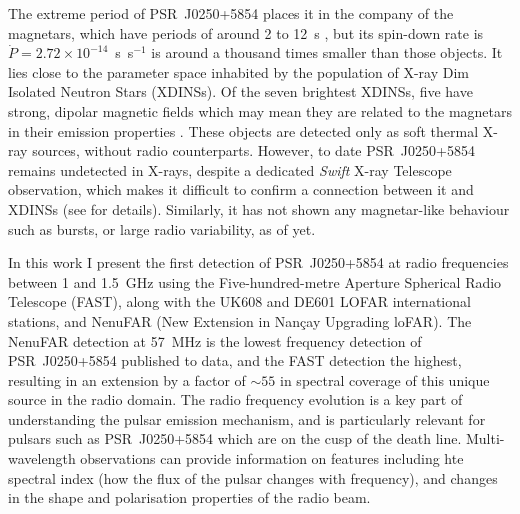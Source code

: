 The extreme period of PSR~J0250+5854 places it in the company of the magnetars, which have periods of around 2 to 12~s \citep{OKxx2014}, but its spin-down rate is $\dot{P}=2.72\times 10^{-14}$~s~s$^{-1}$ is around a thousand times smaller than those objects. It lies close to the parameter space inhabited by the population of X-ray Dim Isolated Neutron Stars (XDINSs). Of the seven brightest XDINSs, five have strong, dipolar magnetic fields which may mean they are related to the magnetars in their emission properties \citep[][see Sec~\ref{sec: intro - general intro - pulsar population}]{Hxxx2007, KKxx2007}. These objects are detected only as soft thermal X-ray sources, without radio counterparts. However, to date PSR~J0250+5854 remains undetected in X-rays, despite a dedicated \textit{Swift} X-ray Telescope observation, which makes it difficult to confirm a connection between it and XDINSs (see \citealt{TBC+2018} for details). Similarly, it has not shown any magnetar-like behaviour such as bursts, or large radio variability, as of yet.

In this work I present the first detection of PSR~J0250+5854 at radio frequencies between 1 and 1.5~GHz using the Five-hundred-metre Aperture Spherical Radio Telescope (FAST), along with the UK608 and DE601 LOFAR international stations, and NenuFAR (New Extension in Nan\c{c}ay Upgrading loFAR). The NenuFAR detection at 57~MHz is the lowest frequency detection of PSR~J0250+5854 published to data, and the FAST detection the highest, resulting in an extension by a factor of $\sim55$ in spectral coverage of this unique source in the radio domain. The radio frequency evolution is a key part of understanding the pulsar emission mechanism, and is particularly relevant for pulsars such as PSR~J0250+5854 which are on the cusp of the death line. Multi-wavelength observations can provide information on features including hte spectral index (how the flux of the pulsar changes with frequency), and changes in the shape and polarisation properties of the radio beam.

